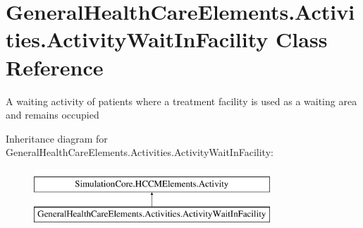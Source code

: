 \hypertarget{class_general_health_care_elements_1_1_activities_1_1_activity_wait_in_facility}{}\section{General\+Health\+Care\+Elements.\+Activities.\+Activity\+Wait\+In\+Facility Class Reference}
\label{class_general_health_care_elements_1_1_activities_1_1_activity_wait_in_facility}


A waiting activity of patients where a treatment facility is used as a waiting area and remains occupied  


Inheritance diagram for General\+Health\+Care\+Elements.\+Activities.\+Activity\+Wait\+In\+Facility\+:\begin{figure}[H]
\begin{center}
\leavevmode
\includegraphics[height=2.000000cm]{class_general_health_care_elements_1_1_activities_1_1_activity_wait_in_facility}
\end{center}
\end{figure}
